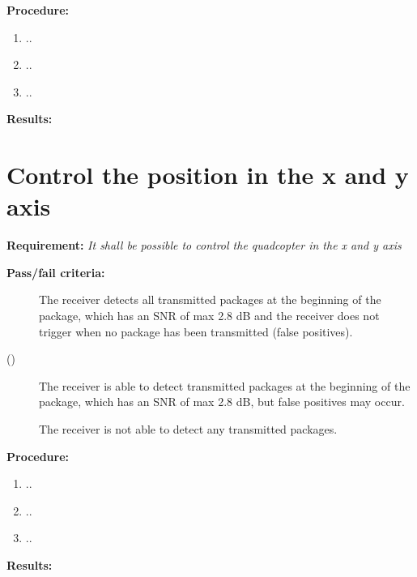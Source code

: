 		
\textbf{Procedure:}\\


\begin{enumerate}
	\item ..
	\item ..
	\item ..
\end{enumerate} 


\textbf{Results:}

\newpage

\section{Control the position in the x and y axis}
\textbf{Requirement:}
\textit{It shall be possible to control the quadcopter in the x and y axis}

\textbf{Pass/fail criteria:}
	\begin{description}
	\item[  ] The receiver detects all transmitted packages at the beginning of the package, which has an SNR of max 2.8 dB and the receiver does not trigger when no package has been transmitted (false positives).
	\item[()]The receiver is able to detect transmitted packages at the beginning of the package, which has an SNR of max 2.8 dB, but false positives may occur.
	\item[  \phantom{)}]The receiver is not able to detect any transmitted packages.
	\end{description}

		
\textbf{Procedure:}\\


\begin{enumerate}
	\item ..
	\item ..
	\item ..
\end{enumerate} 


\textbf{Results:}

\newpage
